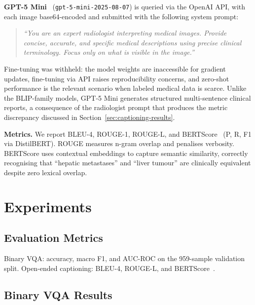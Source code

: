 \documentclass{article}
\begin{document}
\textbf{GPT-5 Mini}~\cite{openai2025} (\texttt{gpt-5-mini-2025-08-07}) is
queried via the OpenAI API, with each image base64-encoded and
submitted with the following system prompt:
\begin{quote}
\small\textit{``You are an expert radiologist interpreting medical images.
Provide concise, accurate, and specific medical descriptions using precise
clinical terminology. Focus only on what is visible in the image.''}
\end{quote}
Fine-tuning was withheld: the model weights are inaccessible for gradient
updates, fine-tuning via API raises reproducibility concerns, and zero-shot
performance is the relevant scenario when labeled medical data is scarce. 
Unlike the BLIP-family models, GPT-5 Mini generates structured
multi-sentence clinical reports, a consequence of the radiologist prompt that
produces the metric discrepancy discussed in
Section~\ref{sec:captioning-results}.

\textbf{Metrics.} We report BLEU-4, ROUGE-1, ROUGE-L, and
BERTScore~\cite{zhang2020bertscore} (P, R, F1 via DistilBERT). ROUGE measures
n-gram overlap and penalises verbosity. BERTScore uses contextual embeddings to
capture semantic similarity, correctly recognising that ``hepatic metastases''
and ``liver tumour'' are clinically equivalent despite zero lexical overlap.


\section{Experiments}
\label{sec:experiments}

\subsection{Evaluation Metrics}
Binary VQA: accuracy, macro F1, and AUC-ROC on the 959-sample validation split.
Open-ended captioning: BLEU-4, ROUGE-L, and
BERTScore~\cite{zhang2020bertscore}.

\subsection{Binary VQA Results}
\end{document}
